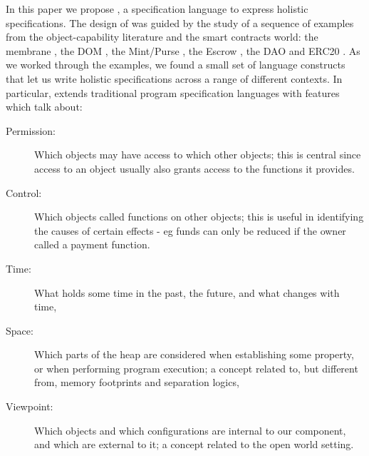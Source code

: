 In this paper we propose \Chainmail, a specification language to
express holistic specifications.
The design of \Chainmail was guided by the study of a sequence of
examples from the object-capability literature and the smart contracts world: the
membrane \cite{membranesJavascript}, the DOM \cite{dd,ddd}, the Mint/Purse \cite{MillerPhD}, the Escrow \cite{proxiesECOOP2013}, the DAO \cite{Dao,DaoBug} and
ERC20 \cite{ERC20}.  As we worked through the
examples, we found a small set of language constructs that let us
write holistic specifications across a range of different contexts.
%
In particular, \Chainmail extends 
traditional program specification languages \cite{Leavens-etal07,Meyer92} with features which talk about:
%
\begin{description}
\item[Permission: ] 
Which objects may have access to which other objects; 
this is central since access to an object usually also grants access to the functions it provides.
%
\item[Control: ]
Which objects called functions on other objects; this
 is useful in identifying the causes of certain effects - eg 
funds can only be reduced if the owner called a payment function.
%
%
\item[Time: ]
What holds some time in  the past, the future, and what changes with time,
\item[Space: ]
Which parts of the heap are considered when establishing some property, or when 
performing program execution; a concept
related to, but different from, memory footprints and separation logics,
\item[Viewpoint: ]
Which objects and which configurations are internal to our component, and which  are
external to it;
a concept related to the open world setting.
\end{description}

